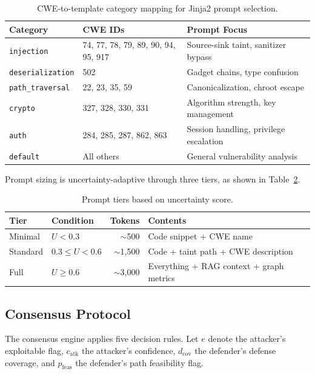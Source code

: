 \begin{table}[H]
\centering
\small
\caption{CWE-to-template category mapping for Jinja2 prompt selection.}
\label{tab:cwe-templates}
\begin{tabular}{llp{5.5cm}}
\toprule
\textbf{Category} & \textbf{CWE IDs} & \textbf{Prompt Focus} \\
\midrule
\texttt{injection}       & 74, 77, 78, 79, 89, 90, 94, 95, 917 & Source-sink taint, sanitizer bypass \\
\texttt{deserialization}  & 502 & Gadget chains, type confusion \\
\texttt{path\_traversal} & 22, 23, 35, 59 & Canonicalization, chroot escape \\
\texttt{crypto}          & 327, 328, 330, 331 & Algorithm strength, key management \\
\texttt{auth}            & 284, 285, 287, 862, 863 & Session handling, privilege escalation \\
\texttt{default}         & All others & General vulnerability analysis \\
\bottomrule
\end{tabular}
\end{table}

Prompt sizing is uncertainty-adaptive through three tiers, as shown in Table~\ref{tab:prompt-tiers}.

\begin{table}[H]
\centering
\small
\caption{Prompt tiers based on uncertainty score.}
\label{tab:prompt-tiers}
\begin{tabular}{llrl}
\toprule
\textbf{Tier} & \textbf{Condition} & \textbf{Tokens} & \textbf{Contents} \\
\midrule
Minimal  & $U < 0.3$ & $\sim$500 & Code snippet + CWE name \\
Standard & $0.3 \leq U < 0.6$ & $\sim$1,500 & Code + taint path + CWE description \\
Full     & $U \geq 0.6$ & $\sim$3,000 & Everything + RAG context + graph metrics \\
\bottomrule
\end{tabular}
\end{table}

\subsection{Consensus Protocol}

The consensus engine applies five decision rules. Let $e$ denote the attacker's exploitable flag, $c_{\text{atk}}$ the attacker's confidence, $d_{\text{cov}}$ the defender's defense coverage, and $p_{\text{feas}}$ the defender's path feasibility flag.

